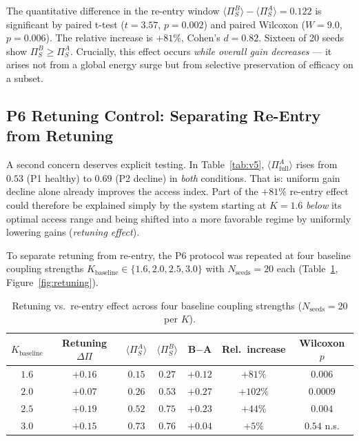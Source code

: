 \documentclass[11pt,a4paper]{article}
\theoremstyle{plain}
\theoremstyle{definition}
\theoremstyle{remark}
\begin{document}
The quantitative difference in the re-entry window $\langle\Pi_S^B\rangle - \langle\Pi_S^A\rangle = 0.122$ is significant by paired t-test ($t = 3.57$, $p = 0.002$) and paired Wilcoxon ($W = 9.0$, $p = 0.006$). The relative increase is $+81\%$, Cohen's $d = 0.82$. Sixteen of 20 seeds show $\Pi_S^B \geq \Pi_S^A$. Crucially, this effect occurs \emph{while overall gain decreases} --- it arises not from a global energy surge but from selective preservation of efficacy on a subset.

\subsection{P6 Retuning Control: Separating Re-Entry from Retuning}
\label{sec:retuning-control}

A second concern deserves explicit testing. In Table~\ref{tab:v5}, $\langle\Pi_{\mathrm{full}}^A\rangle$ rises from $0.53$ (P1 healthy) to $0.69$ (P2 decline) in \emph{both} conditions. That is: uniform gain decline alone already improves the access index. Part of the $+81\%$ re-entry effect could therefore be explained simply by the system starting at $K = 1.6$ \emph{below} its optimal access range and being shifted into a more favorable regime by uniformly lowering gains (\emph{retuning effect}).

To separate retuning from re-entry, the P6 protocol was repeated at four baseline coupling strengths $K_{\mathrm{baseline}} \in \{1.6, 2.0, 2.5, 3.0\}$ with $N_{\mathrm{seeds}} = 20$ each (Table~\ref{tab:retuning}, Figure~\ref{fig:retuning}).

\begin{table}[h]
\centering
\caption{Retuning vs.\ re-entry effect across four baseline coupling strengths ($N_{\mathrm{seeds}} = 20$ per $K$).}
\label{tab:retuning}
\begin{tabular}{ccccccc}
\hline
$K_{\mathrm{baseline}}$ & Retuning $\Delta\Pi$ & $\langle\Pi_S^A\rangle$ & $\langle\Pi_S^B\rangle$ & B$-$A & Rel.\ increase & Wilcoxon $p$ \\
\hline
$1.6$ & $+0.16$ & $0.15$ & $0.27$ & $+0.12$ & $+81\%$  & $0.006$ \\
$2.0$ & $+0.07$ & $0.26$ & $0.53$ & $+0.27$ & $+102\%$ & $0.0009$ \\
$2.5$ & $+0.19$ & $0.52$ & $0.75$ & $+0.23$ & $+44\%$  & $0.004$ \\
$3.0$ & $+0.15$ & $0.73$ & $0.76$ & $+0.04$ & $+5\%$   & $0.54$ n.s. \\
\hline
\end{tabular}
\end{table}
\end{document}
